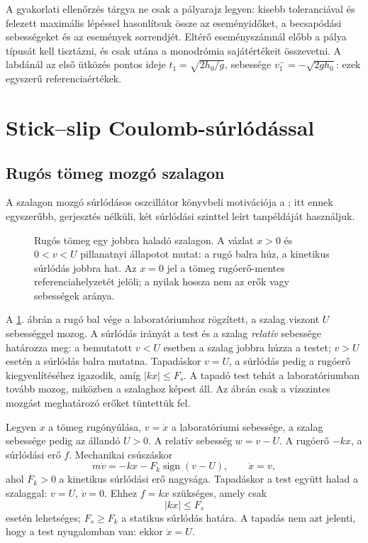 A gyakorlati ellenőrzés tárgya ne csak a pályarajz legyen: kisebb toleranciával és felezett maximális lépéssel hasonlítsuk össze az eseményidőket, a becsapódási sebességeket és az események sorrendjét. Eltérő eseményszámnál előbb a pálya típusát kell tisztázni, és csak utána a monodrómia sajátértékeit összevetni. A labdánál az első ütközés pontos ideje $t_1=\sqrt{2h_0/g}$, sebessége $v_1^-=-\sqrt{2gh_0}$: ezek egyszerű referenciaértékek.

\section{Stick--slip Coulomb-súrlódással}\label{sec:stick_slip}
\subsection{Rugós tömeg mozgó szalagon}
\examplebody

A szalagon mozgó súrlódásos oszcillátor könyvbeli motivációja a \cite[1.3.2. szakasz]{dib}; itt ennek egyszerűbb, gerjesztés nélküli, két súrlódási szinttel leírt tanpéldáját használjuk.

\begin{figure}[htbp]
\centering

\caption{Rugós tömeg egy jobbra haladó szalagon. A vázlat $x>0$ és $0<v<U$ pillanatnyi állapotot mutat: a rugó balra húz, a kinetikus súrlódás jobbra hat. Az $x=0$ jel a tömeg rugóerő-mentes referenciahelyzetét jelöli; a nyilak hossza nem az erők vagy sebességek aránya.}\label{fig:belt_model}
\end{figure}

A \ref{fig:belt_model}. ábrán a rugó bal vége a laboratóriumhoz rögzített, a szalag viszont $U$ sebességgel mozog. A súrlódás irányát a test és a szalag \emph{relatív} sebessége határozza meg: a bemutatott $v<U$ esetben a szalag jobbra húzza a testet; $v>U$ esetén a súrlódás balra mutatna. Tapadáskor $v=U$, a súrlódás pedig a rugóerő kiegyenlítéséhez igazodik, amíg $|kx|\leq F_s$. A tapadó test tehát a laboratóriumban tovább mozog, miközben a szalaghoz képest áll. Az ábrán csak a vízszintes mozgást meghatározó erőket tüntettük fel.

Legyen $x$ a tömeg rugónyúlása, $v=\dot x$ a laboratóriumi sebessége, a szalag sebessége pedig az állandó $U>0$. A relatív sebesség $w=v-U$. A rugóerő $-kx$, a súrlódási erő $f$. Mechanikai csúszáskor
\begin{equation}\label{eq:coulomb_slip}
m\dot v=-kx-F_k\operatorname{sign}(v-U),\qquad \dot x=v,
\end{equation}
ahol $F_k>0$ a kinetikus súrlódási erő nagysága. Tapadáskor a test együtt halad a szalaggal: $v=U$, $\dot v=0$. Ehhez $f=kx$ szükséges, amely csak
\begin{equation}\label{eq:stick_condition}
|kx|\leq F_s
\end{equation}
esetén lehetséges; $F_s\geq F_k$ a statikus súrlódás határa. A tapadás nem azt jelenti, hogy a test nyugalomban van: ekkor $\dot x=U$.

